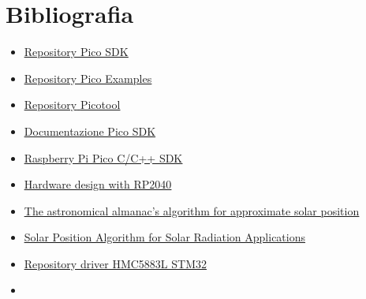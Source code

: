 \chapter{Bibliografia}

\begin{itemize}
\item
  
  \href{https://github.com/raspberrypi/pico-sdk}{\underline{Repository
  Pico SDK}}
  
\item
  
  \href{https://github.com/raspberrypi/pico-examples}{\underline{Repository
  Pico Examples}}
  
\item
  
  \href{https://github.com/raspberrypi/picotool}{\underline{Repository}
  \underline{Picotool}}
  
\item
  
  \href{https://raspberrypi.github.io/pico-sdk-doxygen/}{\underline{Documentazione
  Pico SDK}}
  
\item
  
  \href{https://datasheets.raspberrypi.com/pico/raspberry-pi-pico-c-sdk.pdf}{\underline{Raspberry
  Pi Pico C/C++ SDK}}
  
\item
  
  \href{https://datasheets.raspberrypi.com/rp2040/hardware-design-with-rp2040.pdf}{\underline{Hardware
  design with RP2040}}
  
\item
  
  \href{https://www.researchgate.net/publication/222131147_The_Astronomical_Almanac's_algorithm_for_approximate_solar_position_1950-2050}{\underline{The
  astronomical almanac's algorithm for approximate solar position}}
  
\item
  
  \href{https://www.nrel.gov/docs/fy08osti/34302.pdf}{\underline{Solar
  Position Algorithm for Solar Radiation Applications}}
  
\item
  
  \href{https://github.com/jrowberg/i2cdevlib/blob/master/STM32/HMC5883/HMC5883L.h}{\underline{Repository
  driver HMC5883L STM32}}
  
\item
  

\end{itemize}
